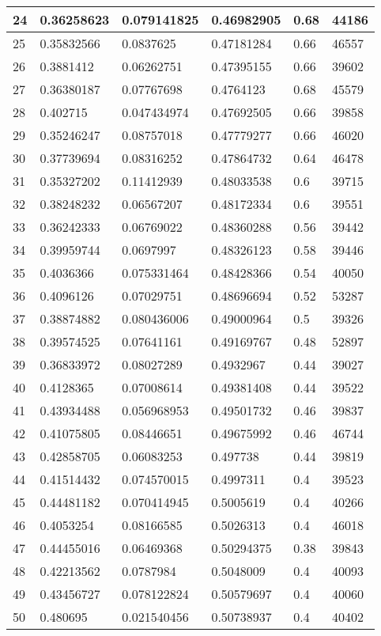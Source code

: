 \begin{longtable}{|l|l|l|l|l|l|}
24 & 0.36258623 & 0.079141825 & 0.46982905 & 0.68 & 44186 \\ \hline 
25 & 0.35832566 & 0.0837625 & 0.47181284 & 0.66 & 46557 \\ \hline 
26 & 0.3881412 & 0.06262751 & 0.47395155 & 0.66 & 39602 \\ \hline 
27 & 0.36380187 & 0.07767698 & 0.4764123 & 0.68 & 45579 \\ \hline 
28 & 0.402715 & 0.047434974 & 0.47692505 & 0.66 & 39858 \\ \hline 
29 & 0.35246247 & 0.08757018 & 0.47779277 & 0.66 & 46020 \\ \hline 
30 & 0.37739694 & 0.08316252 & 0.47864732 & 0.64 & 46478 \\ \hline 
31 & 0.35327202 & 0.11412939 & 0.48033538 & 0.6 & 39715 \\ \hline 
32 & 0.38248232 & 0.06567207 & 0.48172334 & 0.6 & 39551 \\ \hline 
33 & 0.36242333 & 0.06769022 & 0.48360288 & 0.56 & 39442 \\ \hline 
34 & 0.39959744 & 0.0697997 & 0.48326123 & 0.58 & 39446 \\ \hline 
35 & 0.4036366 & 0.075331464 & 0.48428366 & 0.54 & 40050 \\ \hline 
36 & 0.4096126 & 0.07029751 & 0.48696694 & 0.52 & 53287 \\ \hline 
37 & 0.38874882 & 0.080436006 & 0.49000964 & 0.5 & 39326 \\ \hline 
38 & 0.39574525 & 0.07641161 & 0.49169767 & 0.48 & 52897 \\ \hline 
39 & 0.36833972 & 0.08027289 & 0.4932967 & 0.44 & 39027 \\ \hline 
40 & 0.4128365 & 0.07008614 & 0.49381408 & 0.44 & 39522 \\ \hline 
41 & 0.43934488 & 0.056968953 & 0.49501732 & 0.46 & 39837 \\ \hline 
42 & 0.41075805 & 0.08446651 & 0.49675992 & 0.46 & 46744 \\ \hline 
43 & 0.42858705 & 0.06083253 & 0.497738 & 0.44 & 39819 \\ \hline 
44 & 0.41514432 & 0.074570015 & 0.4997311 & 0.4 & 39523 \\ \hline 
45 & 0.44481182 & 0.070414945 & 0.5005619 & 0.4 & 40266 \\ \hline 
46 & 0.4053254 & 0.08166585 & 0.5026313 & 0.4 & 46018 \\ \hline 
47 & 0.44455016 & 0.06469368 & 0.50294375 & 0.38 & 39843 \\ \hline 
48 & 0.42213562 & 0.0787984 & 0.5048009 & 0.4 & 40093 \\ \hline 
49 & 0.43456727 & 0.078122824 & 0.50579697 & 0.4 & 40060 \\ \hline 
50 & 0.480695 & 0.021540456 & 0.50738937 & 0.4 & 40402 \\ \hline 
\end{longtable}